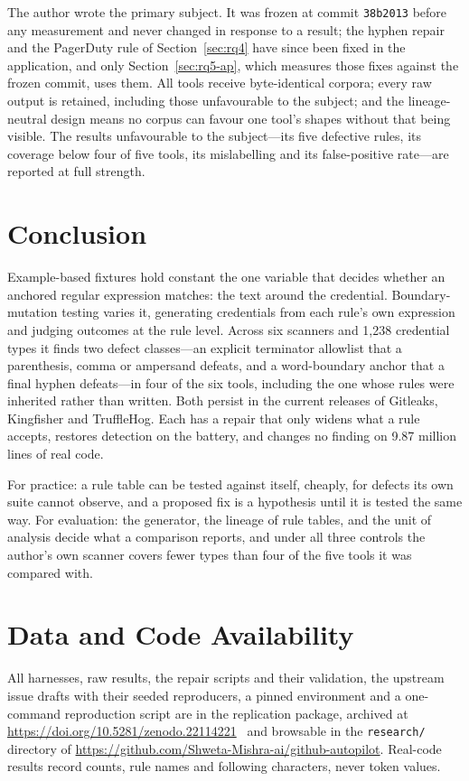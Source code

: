 \documentclass[10pt,journal,compsoc]{IEEEtran}
\begin{document}
The author wrote the primary subject. It was frozen at commit \texttt{38b2013} before any measurement and never changed in response to a result; the hyphen repair and the PagerDuty rule of Section~\ref{sec:rq4} have since been fixed in the application, and only Section~\ref{sec:rq5-ap}, which measures those fixes against the frozen commit, uses them. All tools receive byte-identical corpora; every raw output is retained, including those unfavourable to the subject; and the lineage-neutral design means no corpus can favour one tool's shapes without that being visible. The results unfavourable to the subject---its five defective rules, its coverage below four of five tools, its mislabelling and its false-positive rate---are reported at full strength.

\section{Conclusion}
\label{sec:conclusion}

Example-based fixtures hold constant the one variable that decides whether an anchored regular expression matches: the text around the credential. Boundary-mutation testing varies it, generating credentials from each rule's own expression and judging outcomes at the rule level. Across six scanners and 1{,}238 credential types it finds two defect classes---an explicit terminator allowlist that a parenthesis, comma or ampersand defeats, and a word-boundary anchor that a final hyphen defeats---in four of the six tools, including the one whose rules were inherited rather than written. Both persist in the current releases of Gitleaks, Kingfisher and TruffleHog. Each has a repair that only widens what a rule accepts, restores detection on the battery, and changes no finding on 9.87 million lines of real code.

For practice: a rule table can be tested against itself, cheaply, for defects its own suite cannot observe, and a proposed fix is a hypothesis until it is tested the same way. For evaluation: the generator, the lineage of rule tables, and the unit of analysis decide what a comparison reports, and under all three controls the author's own scanner covers fewer types than four of the five tools it was compared with.

\section*{Data and Code Availability}
All harnesses, raw results, the repair scripts and their validation, the upstream issue drafts with their seeded reproducers, a pinned environment and a one-command reproduction script are in the replication package, archived at \url{https://doi.org/10.5281/zenodo.22114221}~\cite{mishra2026zenodo} and browsable in the \texttt{research/} directory of \url{https://github.com/Shweta-Mishra-ai/github-autopilot}. Real-code results record counts, rule names and following characters, never token values.
\end{document}

